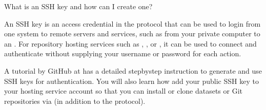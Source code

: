 \ignorespaces {}\label{\detokenize{basics/101-139-hostingservices:sshkey}}\begin{findoutmore}[label={fom-sshkey}, before title={\thetcbcounter\ }, check odd page=true]{What is an SSH key and how can I create one?}
\label{\detokenize{basics/101-139-hostingservices:fom-sshkey}}

\sphinxAtStartPar
An SSH key is an access credential in the {\hyperref[\detokenize{glossary:term-SSH}]{}} protocol that can be used
to login from one system to remote servers and services, such as from your private
computer to an {\hyperref[\detokenize{glossary:term-SSH-server}]{}}. For repository hosting services such as {\hyperref[\detokenize{glossary:term-GIN}]{}},
{\hyperref[\detokenize{glossary:term-GitHub}]{}}, or {\hyperref[\detokenize{glossary:term-GitLab}]{}}, it can be used to connect and authenticate
without supplying your username or password for each action.

\sphinxAtStartPar
A tutorial by GitHub at 
has a detailed step\sphinxhyphen{}by\sphinxhyphen{}step instruction to generate and use SSH keys for authentication.
You will also learn how add your public SSH key to your hosting service account
so that you can install or clone datasets or Git repositories via  (in addition
to the  protocol).


\end{findoutmore}
